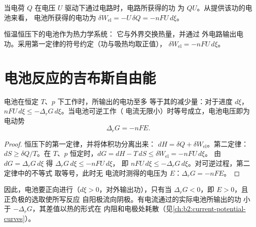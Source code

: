 当电荷 $Q$ 在电压 $U$ 驱动下通过电路时，电路所获得的功
为 $QU$。从提供该功的电池来看，
电池所获得的电功为 $\delta W_{\text{el}} = -U\,\delta Q = -nFU\,
d\xi$。

\begin{omfigure}

{\small 恒温恒压下的电池作为热力学系统：
它与外界交换热量，并通过
外电路输出电功。采用第一定律的符号约定（功与吸热均取正值），
$\delta W_{\text{el}} = -nFU\,d\xi$。}
\end{omfigure}

\section{电池反应的吉布斯自由能}

\begin{theorem}[电功与吉布斯自由能]\label{thm:b2:cell-thermodynamics:delta-g-nfe}
电池在恒定 $T$、$p$ 下工作时，所输出的电功至多
等于其的减少量：对于进度 $d\xi$，
$nFU\,d\xi \leq -\Delta_r G\,d\xi$。当电池可逆工作（
电流无限小）时等号成立，电池电压即为
电动势
\[
  \Delta_r G = -nFE .
\]
\end{theorem}

\begin{proof}
恒压下的第一定律，并将体积功分离出来：
$dH = \delta Q + \delta W_{\text{el}}$。第二定律：$dS \geq \delta Q/T$。在
$T$、$p$ 恒定时，$dG = dH - T\,dS \leq \delta W_{\text{el}} = -nFU\,d\xi$。
由 $dG = \Delta_r G\,d\xi$ 得 $\Delta_r G\,d\xi \leq -nFU\,d\xi$，
即 $nFU\,d\xi \leq -\Delta_r G\,d\xi$。对可逆过程，第二定律中的不等式
取等号，此时无
电流时测得的电压为 $E$：$\Delta_r G = -nFE$。
\end{proof}

因此，电池要正向进行（$d\xi > 0$，对外输出功），只有当 $\Delta_r G <
0$，即 $E > 0$，且正负极的选取使所写反应
自阳极流向阴极。有电流通过的实际电池所输出的功
小于 $-\Delta_r G$，其差值以热的形式在
内阻和电极处耗散（见\cref{ch:b2:current-potential-curves}）。

